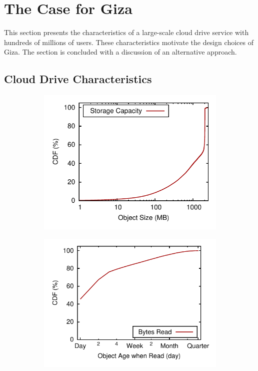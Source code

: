 \section{The Case for Giza}
\label{sec:motivation}

This section presents the characteristics of a large-scale cloud drive service with hundreds of millions of users. These characteristics motivate the design choices of Giza. The section is concluded with a discussion of an alternative approach.

\subsection{Cloud Drive Characteristics}

\begin{figure}[tp]
\hspace{-4em}
\begin{subfigure}{.3\textwidth}
  \centering
  \includegraphics[width=\linewidth]{data/object_size-storage_capacity}
  \caption{}
  \label{fig:object_size-storage_capacity}
\end{subfigure}%
\begin{subfigure}{.3\textwidth}
  \centering
  \includegraphics[width=\linewidth]{data/write_read_gap-bytes_read}

\end{subfigure}
\end{figure}
